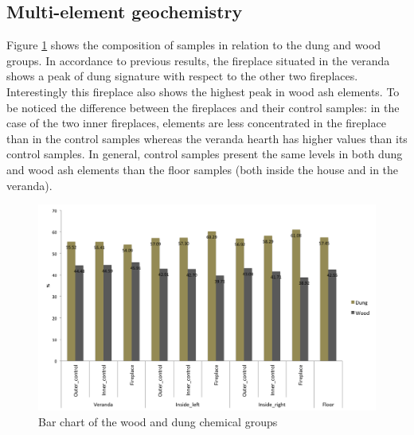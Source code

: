 \documentclass[authoryear,preprint,review,12pt]{elsarticle}
\begin{document}
\subsection{Multi-element geochemistry}
\label{subsec:3.2}
Figure \ref{fig:chem} shows the composition of samples in relation to the dung and wood groups. In accordance to previous results, the fireplace situated in the veranda shows a peak of dung signature with respect to the other two fireplaces. Interestingly this fireplace also shows the highest peak in wood ash elements. To be noticed the difference between the fireplaces and their control samples: in the case of the two inner fireplaces, elements are less concentrated in the fireplace than in the control samples whereas the veranda hearth has higher values than its control samples. In general, control samples present the same levels in both dung and wood ash elements than the floor samples (both inside the house and in the veranda).

\begin{figure}[ht!]
  \begin{center}
    \includegraphics[width=15cm]{figures/chem_bar}
    \caption{Bar chart of the wood and dung chemical groups}
    \label{fig:chem}
  \end{center}
\end{figure}
\end{document}
